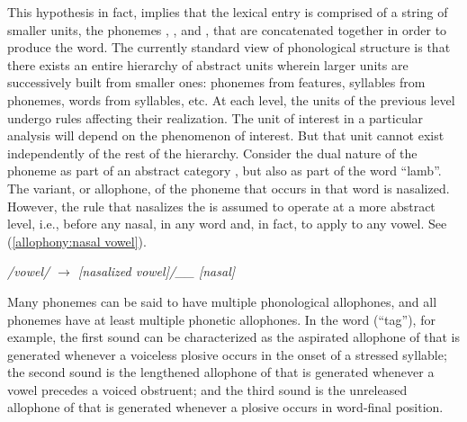 This hypothesis in fact, implies that the lexical entry is comprised
of a string of smaller units, the phonemes , ,
and , that are concatenated together in order to produce
the word. The currently standard view of phonological structure is
that there exists an entire hierarchy of abstract units wherein larger
units are successively built from smaller ones: phonemes from features,
syllables from phonemes, words from syllables, etc. At each level,
the units of the previous level undergo rules affecting their realization.
The unit of interest in a particular analysis will depend on the phenomenon
of interest. But that unit cannot exist independently of the rest
of the hierarchy. Consider the dual nature of the phoneme 
as part of an abstract category , but also as part
of the word “lamb”. The variant, or allophone, of the phoneme
that occurs in that word is nasalized. However, the rule that nasalizes
the  is assumed to operate at a more abstract level,
i.e., before any nasal, in any word and, in fact, to apply to any
vowel. See (\ref{allophony:nasal vowel}). 
\begin{covexample}
\emph{\label{allophony:nasal vowel}/vowel/ $\rightarrow$ {[}nasalized
vowel{]}/\_\_ {[}nasal{]}}
\end{covexample}
Many phonemes can be said to have multiple phonological allophones,
and all phonemes have at least multiple phonetic allophones. In the
word \textipa{[tʰæ;ɡ˺}{]} (“tag”), for example, the first
sound can be characterized as the aspirated allophone of 
that is generated whenever a voiceless plosive occurs in the onset
of a stressed syllable; the second sound is the lengthened allophone
of  that is generated whenever a vowel precedes a voiced
obstruent; and the third sound is the unreleased allophone of 
that is generated whenever a plosive occurs in word-final position. 

